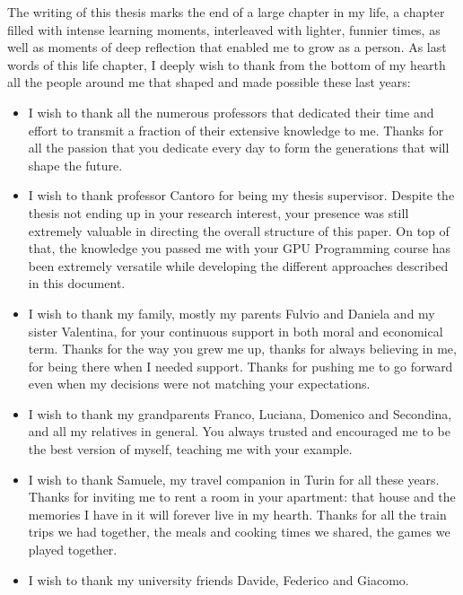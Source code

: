 \newcommand{\ackspace}{\vspace{0.3cm}}
\newcommand{\ackspacebullet}{}

The writing of this thesis marks the end of a large chapter in my life, a chapter filled with intense learning moments, interleaved with lighter, funnier times, as well as moments of deep reflection that enabled me to grow as a person.
As last words of this life chapter, I deeply wish to thank from the bottom of my hearth all the people around me that shaped and made possible these last years:\ackspacebullet
\begin{itemize}
	\itemsep 0em
	\item I wish to thank all the numerous professors that dedicated their time and effort to transmit a fraction of their extensive knowledge to me.
	      Thanks for all the passion that you dedicate every day to form the generations that will shape the future.\ackspacebullet
	\item I wish to thank professor Cantoro for being my thesis supervisor.
	      Despite the thesis not ending up in your research interest, your presence was still extremely valuable in directing the overall structure of this paper.
	      On top of that, the knowledge you passed me with your GPU Programming course has been extremely versatile while developing the different approaches described in this document.\ackspacebullet
	\item I wish to thank my family, mostly my parents Fulvio and Daniela and my sister Valentina, for your continuous support in both moral and economical term.
	      Thanks for the way you grew me up, thanks for always believing in me, for being there when I needed support.
	      Thanks for pushing me to go forward even when my decisions were not matching your expectations.\ackspacebullet
	\item I wish to thank my grandparents Franco, Luciana, Domenico and Secondina, and all my relatives in general.
	      You always trusted and encouraged me to be the best version of myself, teaching me with your example.\ackspacebullet
	\item I wish to thank Samuele, my travel companion in Turin for all these years.
	      Thanks for inviting me to rent a room in your apartment: that house and the memories I have in it will forever live in my hearth.
	      Thanks for all the train trips we had together, the meals and cooking times we shared, the games we played together.\ackspacebullet
	\item I wish to thank my university friends Davide, Federico and Giacomo.

\end{itemize}

